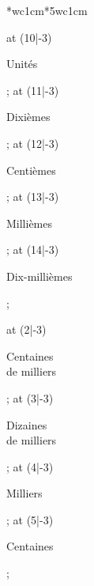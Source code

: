 {{{\begin{center}
\begin{NiceTabular}{*{}{wc{1cm}}*{5}{wc{1cm}}}
{{            \tikz\node[rotate=58] at (10|-3) {\begin{minipage}{1.5cm}\begin{center}\scriptsize Unités\end{center}\end{minipage}};
            \tikz\node[rotate=58] at (11|-3) {\begin{minipage}{1.5cm}\begin{center}\scriptsize Dixièmes\end{center}\end{minipage}};
            \tikz\node[rotate=58] at (12|-3) {\begin{minipage}{1.5cm}\begin{center}\scriptsize Centièmes\end{center}\end{minipage}};
            \tikz\node[rotate=58] at (13|-3) {\begin{minipage}{1.5cm}\begin{center}\scriptsize Millièmes\end{center}\end{minipage}};
            \tikz\node[rotate=58] at (14|-3) {\begin{minipage}{2cm}\begin{center}\scriptsize Dix-millièmes\end{center}\end{minipage}};
          }{%
            \tikz\node[rotate=58] at (2|-3) {\begin{minipage}{1.5cm}\begin{center}\scriptsize Centaines\\de milliers\end{center}\end{minipage}};
            \tikz\node[rotate=58] at (3|-3) {\begin{minipage}{1.5cm}\begin{center}\scriptsize Dizaines\\de milliers\end{center}\end{minipage}};
            \tikz\node[rotate=58] at (4|-3) {\begin{minipage}{1.5cm}\begin{center}\scriptsize Milliers\end{center}\end{minipage}};
            \tikz\node[rotate=58] at (5|-3) {\begin{minipage}{1.5cm}\begin{center}\scriptsize Centaines\end{center}\end{minipage}};
}}
\end{NiceTabular}
\end{center}}}}
